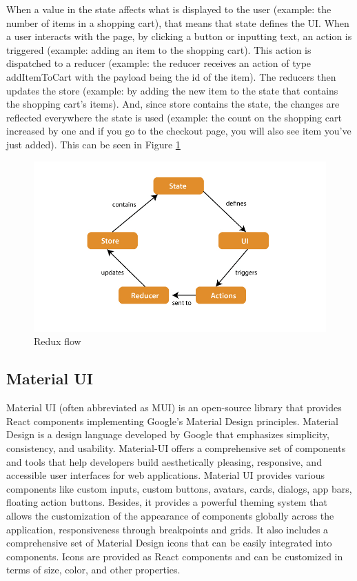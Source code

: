\par When a value in the state affects what is displayed to the user (example: the number of items in a shopping cart), that means that state defines the UI. When a user interacts with the page, by clicking a button or inputting text, an action is triggered (example: adding an item to the shopping cart). This action is dispatched to a reducer (example: the reducer receives an action of type addItemToCart with the payload being the id of the item). The reducers then updates the store (example: by adding the new item to the state that contains the shopping cart's items). And, since store contains the state, the changes are reflected everywhere the state is used (example: the count on the shopping cart increased by one and if you go to the checkout page, you will also see item you've just added). This can be seen in Figure \ref{fig:redux-flow}

\begin{figure}[!ht]
    \centering
    \includegraphics[width=1\linewidth]{redux-flow.png}
    \caption{Redux flow \cite{reduxFlow}}
    \label{fig:redux-flow}
\end{figure}

\subsection{Material UI}

\par Material UI (often abbreviated as MUI) is an open-source library that provides React components implementing Google's Material Design principles. Material Design is a design language developed by Google that emphasizes simplicity, consistency, and usability. Material-UI offers a comprehensive set of components and tools that help developers build aesthetically pleasing, responsive, and accessible user interfaces for web applications. Material UI provides various components like custom inputs, custom buttons, avatars, cards, dialogs, app bars, floating action buttons. Besides, it provides a powerful theming system that allows the customization of the appearance of components globally across the application, responsiveness through breakpoints and grids. It also includes a comprehensive set of Material Design icons that can be easily integrated into components. Icons are provided as React components and can be customized in terms of size, color, and other properties.

